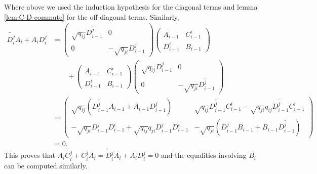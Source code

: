 \documentclass [11pt, proquest] {uwthesis}[2020/02/24]
\begin{document}
\begin{prf}
        Where above we used the induction hypothesis for the diagonal terms and lemma \ref{lem:C-D-commute} for the off-diagonal terms. Similarly,
        \begin{align*}
            \widetilde{D_i^j}A_i + A_iD_i^j&=\begin{pmatrix}
                \sqrt{q_{ij}}\widetilde{D_{i-1}^j} & 0 \\ 0 & -\sqrt{q_{ji}}D_{i-1}^j
            \end{pmatrix}\begin{pmatrix}
                A_{i-1} & C_{i-1}^i\\ D_{i-1}^i & B_{i-1}
            \end{pmatrix} \\
            &\qquad+ \begin{pmatrix}
                A_{i-1} & C_{i-1}^i\\ D_{i-1}^i & B_{i-1}
            \end{pmatrix}\begin{pmatrix}
                \sqrt{q_{ij}}D_{i-1}^j & 0\\0& -\sqrt{q_{ji}}\widetilde{D_{i-1}^j}
            \end{pmatrix}\\
            &=\begin{pmatrix}
                \sqrt{q_{ij}}(\widetilde{D_{i-1}^j}A_{i-1} + A_{i-1}D_{i-1}^j) & \sqrt{q_{ij}}\widetilde{D_{i-1}^j}C_{i-1}^i - \sqrt{q_{ji}}q_{ij}\widetilde{D_{i-1}^j}C_{i-1}^i\\
                -\sqrt{q_{ji}}D_{i-1}^jD_{i-1}^i+\sqrt{q_{ij}}q_{ji}D_{i-1}^jD_{i-1}^i & -\sqrt{q_{ji}}(D_{i-1}^jB_{i-1}+B_{i-1}\widetilde{D_{i-1}^j})
            \end{pmatrix}\\
            &=0.
        \end{align*}
        This proves that $A_i\widetilde{C_i^j}+C_i^jA_i=\widetilde{D_i^j}A_i + A_iD_i^j=0$ and the equalities involving $B_i$ can be computed similarly.
    \end{prf}
    
\end{document}
